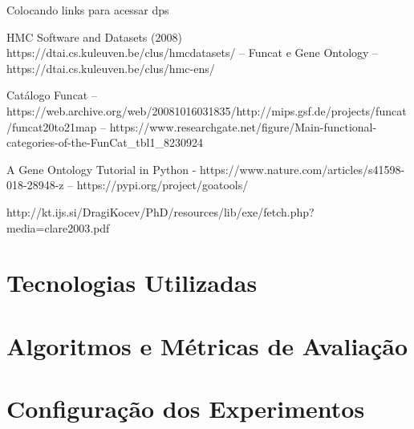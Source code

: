 Colocando links para acessar dps

HMC Software and Datasets (2008) https://dtai.cs.kuleuven.be/clus/hmcdatasets/ -- Funcat e Gene Ontology -- https://dtai.cs.kuleuven.be/clus/hmc-ens/

Catálogo Funcat -- https://web.archive.org/web/20081016031835/http://mips.gsf.de/projects/funcat/funcat20to21map -- https://www.researchgate.net/figure/Main-functional-categories-of-the-FunCat\_tbl1\_8230924

A Gene Ontology Tutorial in Python - https://www.nature.com/articles/s41598-018-28948-z -- https://pypi.org/project/goatools/

http://kt.ijs.si/DragiKocev/PhD/resources/lib/exe/fetch.php?media=clare2003.pdf

\section{Tecnologias Utilizadas}

\section{Algoritmos e Métricas de Avaliação}

\section{Configuração dos Experimentos}


